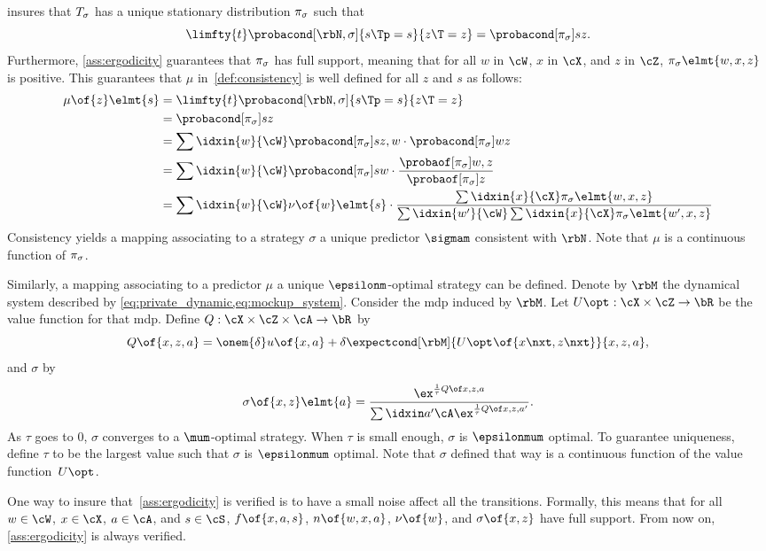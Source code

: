  insures that \(T_{\sigma}\) has a unique stationary distribution \(\pi_{\sigma}\) such that
\[
\limfty{t}\probacond[\rbN, \sigma]{s\Tp = s}{z\T = z} = \probacond[\pi\strat{\sigma}]{s}{z}.
\]
Furthermore, \cref{ass:ergodicity} guarantees that \(\pi_{\sigma}\) has full support, meaning that for all \(w\) in \(\cW\), \(x\) in \(\cX\), and \(z\) in \(\cZ\), \(\pi\strat{\sigma}\elmt{w,x,z}\) is positive.
This guarantees that \(\mu\) in~\cref{def:consistency} is well defined for all \(z\) and \(s\) as follows:
\begin{align*}
\mu \of{z} \elmt{s}
&= \limfty{t}\probacond[\rbN, \sigma]{s\Tp = s}{z\T = z} \\
&= \probacond[\pi\strat{\sigma}]{s}{z} \\
&= \sum\idxin{w}{\cW} \probacond[\pi\strat{\sigma}]{s}{z, w} \cdot \probacond[\pi\strat{\sigma}]{w}{z} \\
&= \sum\idxin{w}{\cW} \probacond[\pi\strat{\sigma}]{s}{w} \cdot \frac{\probaof[\pi\strat{\sigma}]{w, z}}{\probaof[\pi\strat{\sigma}]{z}} \\
&= \sum\idxin{w}{\cW} \nu\of{w}\elmt{s} \cdot \frac{\sum\idxin{x}{\cX} \pi\strat{\sigma}\elmt{w,x,z}}{\sum\idxin{w'}{\cW}\sum\idxin{x}{\cX} \pi\strat{\sigma}\elmt{w',x,z}}
\end{align*}
Consistency yields a mapping associating to a strategy \(\sigma\) a unique predictor \(\sigmam\) consistent with \(\rbN\).
Note that \(\mu\) is a continuous function of \(\pi_{\sigma}\).

Similarly, a mapping associating to a predictor \(\mu\) a unique \(\epsilonm\)-optimal strategy can be defined.
Denote by \(\rbM\) the dynamical system described by \cref{eq:private_dynamic,eq:mockup_system}.
Consider the \ac{mdp} induced by \(\rbM\).
Let \(\Uopt : \cX \times \cZ \to \bR\) be the value function for that \ac{mdp}.
Define \(Q : \cX \times \cZ \times \cA \to \bR\) by
\[
Q \of{x, z, a} = \onem{\delta} u \of{x, a} + \delta \expectcond[\rbM]{\Uopt \of{x\nxt, z\nxt}}{x, z, a},
\]
and \(\sigma\) by
\[
\sigma \of{x, z} \elmt{a} = \gibbsQ.
\]
As \(\tau\) goes to \(0\), \(\sigma\) converges to a \(\mum\)-optimal strategy.
When \(\tau\) is small enough, \(\sigma\) is \(\epsilonmum\) optimal.
To guarantee uniqueness, define \(\tau\) to be the largest value such that \(\sigma\) is \(\epsilonmum\) optimal.
Note that \(\sigma\) defined that way is a continuous function of the value function~\(\Uopt\).

One way to insure that~\cref{ass:ergodicity} is verified is to have a small noise affect all the transitions.
Formally, this means that for all \(w \in \cW\), \(x \in \cX\), \(a \in \cA\), and \(s \in \cS\), \(f \of{x, a, s}\), \(n \of{w, x, a}\), \(\nu \of{w}\), and \(\sigma \of{x, z}\) have full support.
From now on, \cref{ass:ergodicity} is always verified.

